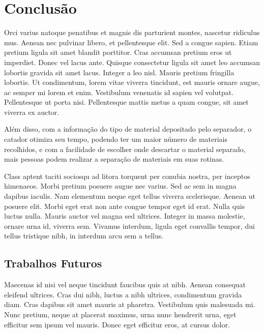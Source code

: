 \chapter{Conclusão}
\label{cap:conclusão}
Orci varius natoque penatibus et magnis dis parturient montes, nascetur ridiculus mus. Aenean nec pulvinar libero, et pellentesque elit. Sed a congue sapien. Etiam pretium ligula sit amet blandit porttitor. Cras accumsan pretium eros ut imperdiet. Donec vel lacus ante. Quisque consectetur ligula sit amet leo accumsan lobortis gravida sit amet lacus. Integer a leo nisl. Mauris pretium fringilla lobortis. Ut condimentum, lorem vitae viverra tincidunt, est mauris ornare augue, ac semper mi lorem et enim. Vestibulum venenatis id sapien vel volutpat. Pellentesque ut porta nisi. Pellentesque mattis metus a quam congue, sit amet viverra ex auctor.

Além disso, com a informação do tipo de material depositado pelo separador, o catador otimiza seu tempo, podendo ter um maior número de materiais recolhidos, e com a facilidade de escolher onde descartar o material separado, mais pessoas podem realizar a separação de materiais em suas rotinas. 

Class aptent taciti sociosqu ad litora torquent per conubia nostra, per inceptos himenaeos. Morbi pretium posuere augue nec varius. Sed ac sem in magna dapibus iaculis. Nam elementum neque eget tellus viverra scelerisque. Aenean ut posuere elit. Morbi eget erat non ante congue tempor eget id erat. Nulla quis luctus nulla. Mauris auctor vel magna sed ultrices. Integer in massa molestie, ornare urna id, viverra sem. Vivamus interdum, ligula eget convallis tempor, dui tellus tristique nibh, in interdum arcu sem a tellus. 

\section{Trabalhos Futuros}

Maecenas id nisi vel neque tincidunt faucibus quis at nibh. Aenean consequat eleifend ultrices. Cras dui nibh, luctus a nibh ultrices, condimentum gravida diam. Cras dapibus sit amet mauris at pharetra. Vestibulum quis malesuada mi. Nunc pretium, neque at placerat maximus, urna nunc hendrerit urna, eget efficitur sem ipsum vel mauris. Donec eget efficitur eros, at cursus dolor.

